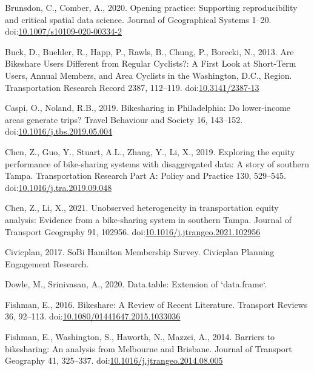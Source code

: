 \documentclass[]{elsarticle} %
\begin{document}
\leavevmode\hypertarget{ref-brunsdon2020opening}{}%
Brunsdon, C., Comber, A., 2020. Opening practice: Supporting
reproducibility and critical spatial data science. Journal of
Geographical Systems 1--20.
doi:\href{https://doi.org/10.1007/s10109-020-00334-2}{10.1007/s10109-020-00334-2}

\leavevmode\hypertarget{ref-buckAreBikeshareUsers2013}{}%
Buck, D., Buehler, R., Happ, P., Rawls, B., Chung, P., Borecki, N.,
2013. Are Bikeshare Users Different from Regular Cyclists?: A First Look
at Short-Term Users, Annual Members, and Area Cyclists in the
Washington, D.C., Region. Transportation Research Record 2387, 112--119.
doi:\href{https://doi.org/10.3141/2387-13}{10.3141/2387-13}

\leavevmode\hypertarget{ref-caspiBikesharingPhiladelphiaLowerincome2019}{}%
Caspi, O., Noland, R.B., 2019. Bikesharing in Philadelphia: Do
lower-income areas generate trips? Travel Behaviour and Society 16,
143--152.
doi:\href{https://doi.org/10.1016/j.tbs.2019.05.004}{10.1016/j.tbs.2019.05.004}

\leavevmode\hypertarget{ref-chenExploringEquityPerformance2019}{}%
Chen, Z., Guo, Y., Stuart, A.L., Zhang, Y., Li, X., 2019. Exploring the
equity performance of bike-sharing systems with disaggregated data: A
story of southern Tampa. Transportation Research Part A: Policy and
Practice 130, 529--545.
doi:\href{https://doi.org/10.1016/j.tra.2019.09.048}{10.1016/j.tra.2019.09.048}

\leavevmode\hypertarget{ref-chenUnobservedHeterogeneityTransportation2021}{}%
Chen, Z., Li, X., 2021. Unobserved heterogeneity in transportation
equity analysis: Evidence from a bike-sharing system in southern Tampa.
Journal of Transport Geography 91, 102956.
doi:\href{https://doi.org/10.1016/j.jtrangeo.2021.102956}{10.1016/j.jtrangeo.2021.102956}

\leavevmode\hypertarget{ref-civicplanSoBiHamiltonMembership2017}{}%
Civicplan, 2017. SoBi Hamilton Membership Survey. Civicplan \textbar{}
Planning Engagement Research.

\leavevmode\hypertarget{ref-R-data.table}{}%
Dowle, M., Srinivasan, A., 2020. Data.table: Extension of `data.frame`.

\leavevmode\hypertarget{ref-fishmanBikeshareReviewRecent2016}{}%
Fishman, E., 2016. Bikeshare: A Review of Recent Literature. Transport
Reviews 36, 92--113.
doi:\href{https://doi.org/10.1080/01441647.2015.1033036}{10.1080/01441647.2015.1033036}

\leavevmode\hypertarget{ref-fishmanBarriersBikesharingAnalysis2014}{}%
Fishman, E., Washington, S., Haworth, N., Mazzei, A., 2014. Barriers to
bikesharing: An analysis from Melbourne and Brisbane. Journal of
Transport Geography 41, 325--337.
doi:\href{https://doi.org/10.1016/j.jtrangeo.2014.08.005}{10.1016/j.jtrangeo.2014.08.005}
\end{document}
